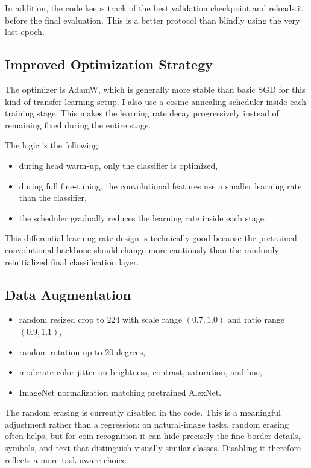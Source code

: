 \documentclass[11pt,a4paper]{article}
\begin{document}
In addition, the code keeps track of the best validation checkpoint and reloads it before the final evaluation. This is a better protocol than blindly using the very last epoch.

\subsection{Improved Optimization Strategy}
The optimizer is AdamW, which is generally more stable than basic SGD for this kind of transfer-learning setup. I also use a cosine annealing scheduler inside each training stage. This makes the learning rate decay progressively instead of remaining fixed during the entire stage.

The logic is the following:
\begin{itemize}[leftmargin=1.4em]
    \item during head warm-up, only the classifier is optimized,
    \item during full fine-tuning, the convolutional features use a smaller learning rate than the classifier,
    \item the scheduler gradually reduces the learning rate inside each stage.
\end{itemize}

This differential learning-rate design is technically good because the pretrained convolutional backbone should change more cautiously than the randomly reinitialized final classification layer.

\subsection{Data Augmentation}
\begin{itemize}[leftmargin=1.4em]
    \item random resized crop to 224 with scale range $(0.7, 1.0)$ and ratio range $(0.9, 1.1)$,
    \item random rotation up to 20 degrees,
    \item moderate color jitter on brightness, contrast, saturation, and hue,
    \item ImageNet normalization matching pretrained AlexNet.
\end{itemize}

The random erasing is currently disabled in the code. This is a meaningful adjustment rather than a regression: on natural-image tasks, random erasing often helps, but for coin recognition it can hide precisely the fine border details, symbols, and text that distinguish visually similar classes. Disabling it therefore reflects a more task-aware choice.
\end{document}
